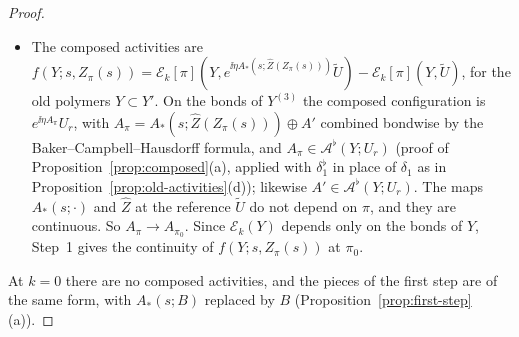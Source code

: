 \begin{proof}
\begin{itemize}
\item The composed activities are $f(Y;s,Z_\pi(s))=\mathcal E_k[\pi](Y,e^{\ii\eta A_*(s;\hat Z(Z_\pi(s)))}\tilde U)-\mathcal E_k[\pi](Y,\tilde U)$, for the old polymers $Y\subset Y'$. On the bonds of $Y^{(3)}$ the composed configuration is $e^{\ii\eta A_\pi}U_r$, with $A_\pi=A_*(s;\hat Z(Z_\pi(s)))\oplus A'$ combined bondwise by the Baker--Campbell--Hausdorff formula, and $A_\pi\in\mathcal A^\flat(Y;U_r)$ (proof of Proposition~\ref{prop:composed}(a), applied with $\delta_1^\flat$ in place of $\delta_1$ as in Proposition~\ref{prop:old-activities}(d)); likewise $A'\in\mathcal A^\flat(Y;U_r)$. The maps $A_*(s;\cdot)$ and $\hat Z$ at the reference $\tilde U$ do not depend on $\pi$, and they are continuous. So $A_\pi\to A_{\pi_0}$. Since $\mathcal E_k(Y)$ depends only on the bonds of $Y$, Step~1 gives the continuity of $f(Y;s,Z_\pi(s))$ at $\pi_0$.
\end{itemize}
At $k=0$ there are no composed activities, and the pieces of the first step are of the same form, with $A_*(s;B)$ replaced by $B$ (Proposition~\ref{prop:first-step}(a)).


\end{proof}
